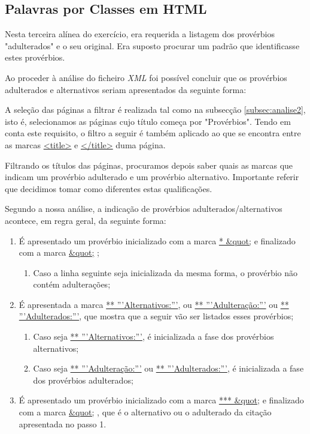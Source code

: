 \documentclass[11pt,a4paper]{report}
\begin{document}
\subsection{Palavras por Classes em HTML}

Nesta terceira alínea do exercício, era requerida a listagem dos provérbios "adulterados" e o seu original. Era suposto procurar um padrão que identificasse estes provérbios.

Ao proceder à análise do ficheiro \textit{XML} foi possível concluir que os provérbios adulterados e alternativos seriam apresentados da seguinte forma:


A seleção das páginas a filtrar é realizada tal como na subsecção \ref{subsec:analise2}, isto é, selecionamos as páginas cujo título começa por "Provérbios". Tendo em conta este requisito, o filtro a seguir é também aplicado ao que se encontra entre as marcas \underline{<title>} e \underline{</title>} duma página.

Filtrando os títulos das páginas, procuramos depois saber quais as marcas que indicam um provérbio adulterado e um provérbio alternativo. Importante referir que decidimos tomar como diferentes estas qualificações.

\vspace{0.2cm}

Segundo a nossa análise, a indicação de provérbios adulterados/alternativos acontece, em regra geral, da seguinte forma:
\begin{enumerate}
\item É apresentado um provérbio inicializado com a marca \underline{* \&quot;} e finalizado com a marca \underline{\&quot;} ;
	\begin{enumerate}
		\item Caso a linha seguinte seja inicializada da mesma forma, o provérbio não contém adulterações;
	\end{enumerate}
\item É apresentada a marca \underline{** '''Alternativos:'''}, ou \underline{** '''Adulteração:'''} ou \underline{** '''Adulterados:'''}, que mostra que a seguir vão ser listados esses provérbios;
	\begin{enumerate}
		\item Caso seja \underline{** '''Alternativos:'''}, é inicializada a fase dos provérbios alternativos;
		\item Caso seja \underline{** '''Adulteração:'''} ou \underline{** '''Adulterados:'''}, é inicializada a fase dos provérbios adulterados;
	\end{enumerate}
\item É apresentado um provérbio inicializado com a marca \underline{*** \&quot;} e finalizado com a marca \underline{\&quot;} , que é o alternativo ou o adulterado da citação apresentada no passo 1.
\end{enumerate}
\end{document}
